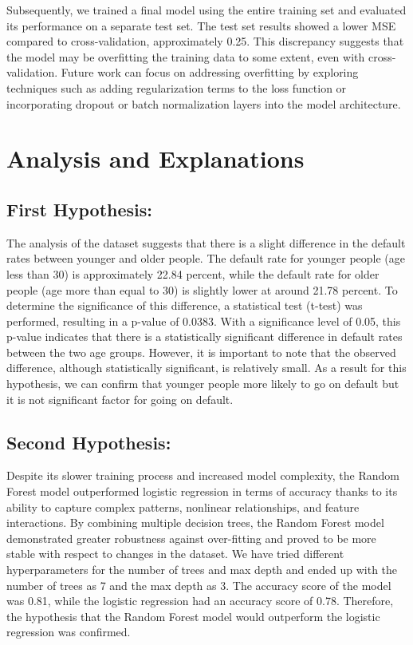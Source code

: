 \documentclass[nohyperref]{article}
\theoremstyle{plain}
\theoremstyle{definition}
\theoremstyle{remark}
\begin{document}
Subsequently, we trained a final model using the entire training set and evaluated its performance on a separate test set. The test set results showed a lower MSE compared to cross-validation, approximately 0.25. This discrepancy suggests that the model may be overfitting the training data to some extent, even with cross-validation. Future work can focus on addressing overfitting by exploring techniques such as adding regularization terms to the loss function or incorporating dropout or batch normalization layers into the model architecture.

\section{Analysis and Explanations}

\subsection{First Hypothesis:}
The analysis of the dataset suggests that there is a slight difference in the default rates between younger and older people. The default rate for younger people (age less than 30) is approximately 22.84 percent, while the default rate for older people (age more than equal to  30) is slightly lower at around 21.78 percent. To determine the significance of this difference, a statistical test (t-test) was performed, resulting in a p-value of 0.0383. With a significance level of 0.05, this p-value indicates that there is a statistically significant difference in default rates between the two age groups. However, it is important to note that the observed difference, although statistically significant, is relatively small. As a result for this hypothesis, we can confirm that younger people more likely to go on default but it is not significant factor for going on default.

\subsection{Second Hypothesis:}
Despite its slower training process and increased model complexity, the Random Forest model outperformed logistic regression in terms of accuracy thanks to its ability to capture complex patterns, nonlinear relationships, and feature interactions. By combining multiple decision trees, the Random Forest model demonstrated greater robustness against over-fitting and proved to be more stable with respect to changes in the dataset. We have tried different hyperparameters for the number of trees and max depth and ended up with the number of trees as 7 and the max depth as 3. The accuracy score of the model was 0.81, while the logistic regression had an accuracy score of 0.78. Therefore, the hypothesis that the Random Forest model would outperform the logistic regression was confirmed.
\end{document}
